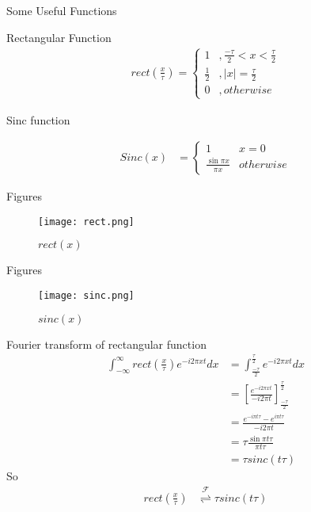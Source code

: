 \documentclass{beamer}
\providecommand{\brak}[1]{\ensuremath{\left(#1\right)}}
\providecommand{\abs}[1]{\vert#1\vert}
\providecommand{\fourier}{\overset{\mathcal{F}}{ \rightleftharpoons}}
\providecommand{\sbrak}[1]{\ensuremath{{}\left[#1\right]}}
\begin{document}
\begin{frame}{Some Useful Functions}
\begin{block}{Rectangular Function}
\begin{align}
 rect\brak{\frac{x}{\tau}}=
\begin{cases}
1 & ,\frac{-\tau}{2} < x < \frac{\tau}{2}\\
\frac{1}{2}& ,\abs{x}=\frac{\tau}{2}\\
0 & ,otherwise
\end{cases} 
\end{align}
\end{block}
\begin{block}{Sinc function}

\begin{align}
Sinc(x)&=
\begin{cases}
1 & x=0\\
\frac{\sin{\pi x}}{\pi x} & otherwise
\end{cases}
\end{align}
\end{block}
\end{frame}
\begin{frame}{Figures}
\begin{figure}[!ht]
\centering
\texttt{[image: rect.png]}
\caption{$rect(x)$}
\label{rect}
\end{figure}
\end{frame}
\begin{frame}{Figures}
\begin{figure}[!ht]
\centering
\texttt{[image: sinc.png]}
\caption{$sinc(x)$}
\label{rect}
\end{figure}
\end{frame}
\begin{frame}{Fourier transform of rectangular function}
\begin{align}
    \int_{-\infty}^{\infty} rect\brak{\frac{x}{\tau}} e^{-i2\pi xt} dx&= \int_{\frac{-\tau}{2}}^{\frac{\tau}{2}} e^{-i2\pi xt}dx\\
    &=\sbrak{\frac{e^{-i2\pi xt}}{-i2\pi t}}_{\frac{-\tau}{2}}^{\frac{\tau}{2}}\\
    &=\frac{e^{-i\pi t\tau}-e^{i\pi t\tau}}{-i2\pi t}\\
    &=\tau \frac{\sin{\pi t\tau}}{\pi t\tau}\\
    &=\tau sinc(t\tau)
\end{align} 
So
\begin{align}
     rect\brak{\frac{x}{\tau}} &\fourier \tau sinc(t\tau)
\end{align}
\end{frame}
\end{document}
